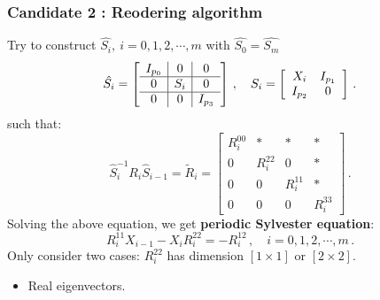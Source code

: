 \documentclass[mathserif, handout]{beamer}
\begin{document}
\begin{frame}[allowframebreaks]
  \frametitle{Candidate 2 : Reodering algorithm}

  Try to construct  $\hat{S_{i}},\:i=0,1,2,\cdots,m$ with
  $\hat{S_{0}}=\hat{S_{m}}$ 
  \[
  \hat{S_{i}}=
  \left[
    \begin{array}{c|c|c}
      I_{p_{0}} & 0 & 0  \\ \hline
      0 & S_{i} & 0 \\ \hline
      0 & 0 & I_{p_{3}}
    \end{array}
  \right]
  \,,
  \quad
  S_{i}=
  \left[
    \begin{array}{c c}
      X_{i} & I_{p_{1}} \\
      I_{p_{2}} & 0
    \end{array}
  \right]
  \,.
  \]
  such that:
  \[
  \hat{S}_{i}^{-1}R_{i}\hat{S}_{i-1}=\tilde{R}_{i}=
  \left[
    \begin{array}{c|cc|c}
      R^{00}_{i} & * & *& * \\ \hline
      0 & R^{22}_{i} & 0 & * \\
      0 & 0 & R^{11}_{i} & * \\ \hline
      0 & 0 & 0 & R^{33}_{i}
    \end{array}
  \right]
  \,.
  \]
  Solving the above equation, we get
  \textbf{periodic Sylvester equation}:
  \begin{equation}
    \label{eq:xdpse}
    R^{11}_{i}X_{i-1}-X_{i}R^{22}_{i}=-R^{12}_{i}
    \,,\quad i=0,1,2,\cdots,m
    \,.
  \end{equation}
  Only consider {\color{red} two cases}: $R^{22}_i$ has dimension $[1\!\times\! 1]$
  or $[2\!\times\! 2]$.


  \begin{itemize}
  \item Real eigenvectors.
    

\end{itemize}
\end{frame}
\end{document}

